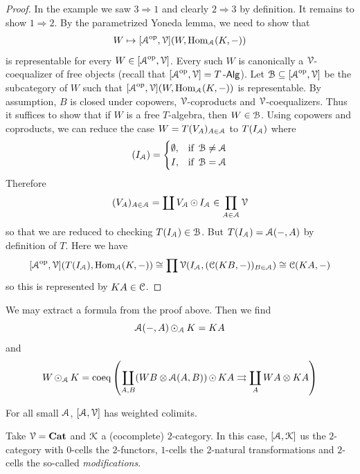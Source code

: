 \documentclass[a4paper,11pt,oneside,openany]{scrbook}
\begin{document}
\begin{proof}
	In the example we saw $3\Rightarrow1$ and clearly $2\Rightarrow3$ by definition. It remains to show $1\Rightarrow2$. By the parametrized Yoneda lemma, we need to show that
	$$W\mapsto[\A^{\op},\V](W,\Hom_{\A}(K,-))$$
	is representable for every $W\in[\A^{\op},\V]$. Every such $W$ is canonically a $\V$-coequalizer of free objects (recall that $[\A^{\op},\V]=T\Alg$). Let $\B\subseteq[\A^{\op},\V]$ be the subcategory of $W$ such that $[\A^{\op},\V](W,\Hom_{\A}(K,-))$ is representable. By assumption, $B$ is closed under copowers, $\V$-coproducts and $\V$-coequalizers. Thus it suffices to show that if $W$ is a free $T$-algebra, then $W\in\B$. Using copowers and coproducts, we can reduce the case $W=T(V_A)_{A\in\A}$ to $T(I_{\A})$ where
	$$(I_{\A})=\begin{cases} \emptyset, & \mbox{if } \B\ne\A \\ I, & \mbox{if } \B=\A
		\end{cases}$$
	Therefore $$(V_A)_{A\in\A}=\coprod{V_{\A}\copw I_{\A}}\in\prod_{A\in\A}\V$$
	so that we are reduced to checking $T(I_{\A})\in\B$. But $T(I_{\A})=\A(-,A)$ by definition of $T$. Here we have
	$$[\A^{\op},\V](T(I_{\A}),\Hom_{\A}(K,-))\cong\prod\V(I_{\A},(\C(KB,-))_{B\in\A})\cong\C(KA,-)$$
	so this is represented by $KA\in\C$.
\end{proof}
\begin{rmk}
	We may extract a formula from the proof above. Then we find $$\A(-,A)\copw_{\A}K=KA$$ and $$W\copw_{\A}K=\text{coeq}\left(\coprod_{A,B}(WB\otimes\A(A,B))\copw KA\rightrightarrows\coprod_{A}WA\otimes KA \right)$$
\end{rmk}
\begin{cor}
	For all small $\A$, $[\A,\V]$ has weighted colimits.
\end{cor}
\begin{exmp}
	Take $\V=\Cat$ and $\K$ a (cocomplete) $2$-category. In this case, $[\A,\K]$ us the $2$-category with $0$-cells the $2$-functors, $1$-cells the $2$-natural transformations and $2$-cells the so-called \emph{modifications}.
\end{exmp}
\end{document}
